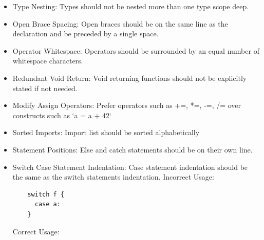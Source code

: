 \documentclass[12pt]{article}
\begin{document}
\begin{itemize}
  \item Type Nesting:\newline
    Types should not be nested more than one type scope deep. \newline
     \newline
  \item Open Brace Spacing:\newline
    Open braces should be on the same line as the declaration and be preceded by a single space. \newline
     \newline
  \item Operator Whitespace:\newline
    Operators should be surrounded by an equal number of whitespace characters. \newline
     \newline
  \item Redundant Void Return:\newline
    Void returning functions should not be explicitly stated if not needed. \newline
     \newline
  \item Modify Assign Operators:\newline
    Prefer operators such as +=, *=, -=, /= over constructs such as `a = a + 42` \newline
     \newline
  \item Sorted Imports:\newline
    Import list should be sorted alphabetically \newline
     \newline
  \item Statement Positions:\newline
    Else and catch statements should be on their own line. \newline
     \newline
  \item Switch Case Statement Indentation:\newline
    Case statement indentation should be the same as the switch statements indentation. \newline
    Incorrect Usage: \newline
    \begin{verbatim}
    switch f {
      case a:
    }
    \end{verbatim}
    Correct Usage: \newline
    \begin{verbatim}

\end{verbatim}
\end{itemize}
\end{document}
